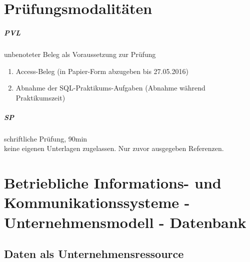 

%


\newcommand{\folie}[2]{\begin{center}
\texttt{[image: Vorlesung/oneperpage/Kap\#1.pdf]}
\end{center}}
\newcommand{\Folie}[2]{\begin{center}
\texttt{[image: Vorlesung/oneperpage/Kap\#1.pdf]}
\end{center}}


\maketitle
\newpage
\tableofcontents
\newpage

\chapter*{Prüfungsmodalitäten}
\paragraph{PVL} unbenoteter Beleg als Voraussetzung zur Prüfung
\begin{enumerate}
\item Access-Beleg (in Papier-Form abzugeben bis 27.05.2016)
\item Abnahme der SQL-Praktikums-Aufgaben (Abnahme während Praktikumszeit)
\end{enumerate}

\paragraph{SP} schriftliche Prüfung, 90min\\
keine eigenen Unterlagen zugelassen. Nur zuvor ausgegeben Referenzen.

\chapter[Datenbank als System und Modell]{Betriebliche Informations- und Kommunikationssysteme - Unternehmensmodell - Datenbank}

\section{Daten als Unternehmensressource}
